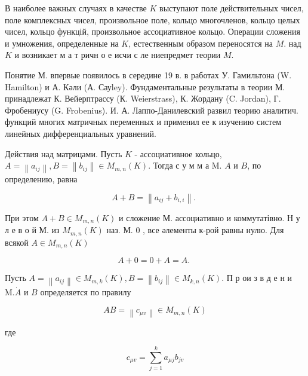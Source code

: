\documentclass[10pt]{article}
\begin{document}
В наиболее важных случаях в качестве $K$ выступают поле действительных чисел, поле комплексных чисел, произвольное поле, кольцо многочленов, кольцо целых чисел, кольцо функцій, произвольное ассоциативное кольцо. Операции сложения и умножения, определенные на $K$, естественным образом переносятся на $M$. над $K$ и возникает м а т ричн о е исчи с ле ниепредмет теории $M$.



Понятие М. впервые появилось в середине 19 в. в работах У. Гамильтона (W. Hamilton) и А. Кәли (А. Сауley). Фундаментальные результаты в теории М. принадлежат К. Вейерптрассу (К. Weierstrass), К. Жордану (C. Jordan), Г. Фробениусу (G. Frobenius). И. А. Лаппо-Данилевский развил теорию аналитич. функций многих матричных переменных и применил ее к изучению систем линейных дифференциальных уравнений.



Действия над матрицами. Пусть $K$ - ассоциативное кольцо, $A=\left\|a_{i j}\right\|, B=\left\|b_{i j}\right\| \in M_{m, n}(K)$. Тогда с у м м а M. $A$ и $B$, по определению, равна



\[

A+B=\left\|a_{i j}+b_{i, i}\right\| \text {. }

\]



При этом $A+B \in M_{m, n}(K)$ и сложение М. ассоциативно и коммутатівно. Н у л е в о й М. из $M_{m, n}(K)$ наз. М. 0 , все әлементы к-рой равны нулю. Для всякой $A \in M_{m, n}(K)$



\[

A+0=0+A=A \text {. }

\]



Пусть $A=\left\|a_{i j}\right\| \in M_{m, k}(K), B=\left\|b_{i j}\right\| \in M_{k, n}(K)$. П р ои з в д е н и $\mathrm{M} . \dot{A}$ и $B$ определяется по правилу



\[

A B=\left\|c_{\mu v}\right\| \in M_{m, n}(K)

\]



где



\[

c_{\mu v}=\sum_{j=1}^{k} a_{\mu j} b_{j v}

\]
\end{document}
